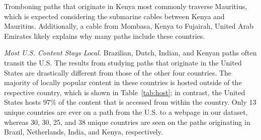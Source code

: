 Tromboning paths that originate in Kenya most commonly traverse Mauritius,
which is expected considering the submarine cables between Kenya and
Mauritius.  Additionally, a cable from Mombasa,
Kenya to Fujairah, United Arab Emirates likely explains why many
paths include these countries. 


{\it Most U.S. Content Stays Local.} Brazilian, Dutch, Indian, and Kenyan paths
often transit the U.S. The results from
studying paths that originate in the United States are drastically different from
those
of the other four countries.  The majority of locally popular content in these countries
is hosted outside of the respective country, which is shown in Table~\ref{tab:host}; in contrast, the United States hosts
97\% of the
content that is accessed from within the country.  Only 13 unique countries
are ever on a path from the U.S. to a webpage in our dataset, whereas 30, 30, 25, and 38 unique countries are seen on the paths
originating in Brazil, Netherlands, India, and Kenya, respectively.







